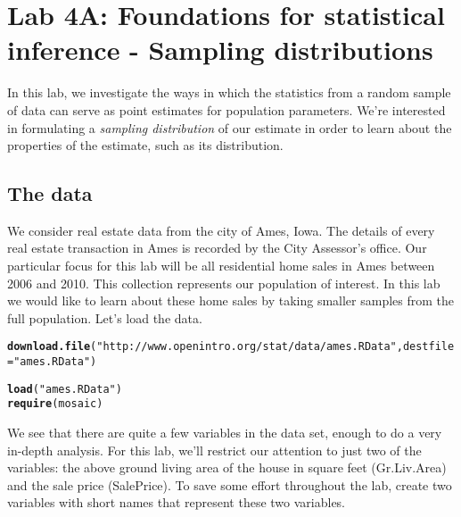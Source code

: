 \documentclass{article}\usepackage[]{graphicx}\usepackage[]{color}
\makeatletter
\newcommand{\hlstr}[1]{\textcolor[rgb]{0.192,0.494,0.8}{#1}}%
\newcommand{\hlstd}[1]{\textcolor[rgb]{0.345,0.345,0.345}{#1}}%
\newcommand{\hlkwc}[1]{\textcolor[rgb]{0.333,0.667,0.333}{#1}}%
\newcommand{\hlkwd}[1]{\textcolor[rgb]{0.737,0.353,0.396}{\textbf{#1}}}%
\newenvironment{kframe}{%
 \def\at@end@of@kframe{}%
 \ifinner\ifhmode%
  \def\at@end@of@kframe{\end{minipage}}%
  \begin{minipage}{\columnwidth}%
 \fi\fi%
 \def\FrameCommand##1{\hskip\@totalleftmargin \hskip-\fboxsep
 \colorbox{shadecolor}{##1}\hskip-\fboxsep
     \hskip-\linewidth \hskip-\@totalleftmargin \hskip\columnwidth}%
 \MakeFramed {\advance\hsize-\width
   \@totalleftmargin\z@ \linewidth\hsize
   \@setminipage}}%
 {\par\unskip\endMakeFramed%
 \at@end@of@kframe}
\newenvironment{knitrout}{}{} %
\makeatother
\begin{document}

\section*{Lab 4A: Foundations for statistical inference - Sampling distributions}
In this lab, we investigate the ways in which the statistics from a random sample of data can serve as point estimates for population parameters.  We're interested in formulating a \emph{sampling distribution} of our estimate in order to learn about the properties of the estimate, such as its distribution.

\subsection*{The data}
We consider real estate data from the city of Ames, Iowa.  The details of every real estate transaction in Ames is recorded by the City Assessor's office.  Our particular focus for this lab will be all residential home sales in Ames between 2006 and 2010.  This collection represents our population of interest.  In this lab we would like to learn about these home sales by taking smaller samples from the full population.  Let's load the data.

\begin{knitrout}
\color{fgcolor}\begin{kframe}
\begin{alltt}
\hlkwd{download.file}\hlstd{(}\hlstr{"http://www.openintro.org/stat/data/ames.RData"}\hlstd{,} \hlkwc{destfile} \hlstd{=} \hlstr{"ames.RData"}\hlstd{)}

\hlkwd{load}\hlstd{(}\hlstr{"ames.RData"}\hlstd{)}
\hlkwd{require}\hlstd{(mosaic)}
\end{alltt}
\end{kframe}
\end{knitrout}


We see that there are quite a few variables in the data set, enough to do a very in-depth analysis.  For this lab, we'll restrict our attention to just two of the variables: the above ground living area of the house in square feet (\hlstd{Gr.Liv.Area}) and the sale price (\hlstd{SalePrice}).  To save some effort throughout the lab, create two variables with short names that represent these two variables.  
\end{document}
